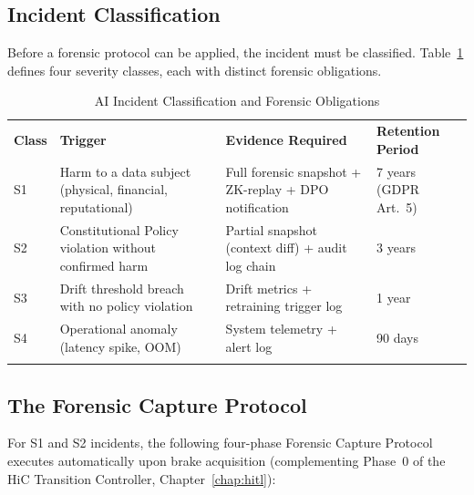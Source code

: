 \subsection{Incident Classification}
\label{subsec:incident_classification}

Before a forensic protocol can be applied, the incident must be classified. Table~\ref{tab:incident_classes} defines four severity classes, each with distinct forensic obligations.

\begin{table}[ht]
\centering
\caption{AI Incident Classification and Forensic Obligations}
\label{tab:incident_classes}
\begin{tabular}{p{1.5cm} p{3.8cm} p{3.5cm} p{3.0cm}}
\hline\noalign{\smallskip}
\textbf{Class} & \textbf{Trigger} & \textbf{Evidence Required} & \textbf{Retention Period} \\
\noalign{\smallskip}\svhline\noalign{\smallskip}
S1 & Harm to a data subject (physical, financial, reputational) & Full forensic snapshot + ZK-replay + DPO notification & 7 years (GDPR Art.~5) \\[4pt]
S2 & Constitutional Policy violation without confirmed harm & Partial snapshot (context diff) + audit log chain & 3 years \\[4pt]
S3 & Drift threshold breach with no policy violation & Drift metrics + retraining trigger log & 1 year \\[4pt]
S4 & Operational anomaly (latency spike, OOM) & System telemetry + alert log & 90 days \\
\noalign{\smallskip}\hline\noalign{\smallskip}
\end{tabular}
\end{table}

\subsection{The Forensic Capture Protocol}
\label{subsec:forensic_capture}

For S1 and S2 incidents, the following four-phase Forensic Capture Protocol executes automatically upon brake acquisition (complementing Phase~0 of the HiC Transition Controller, Chapter~\ref{chap:hitl}):

